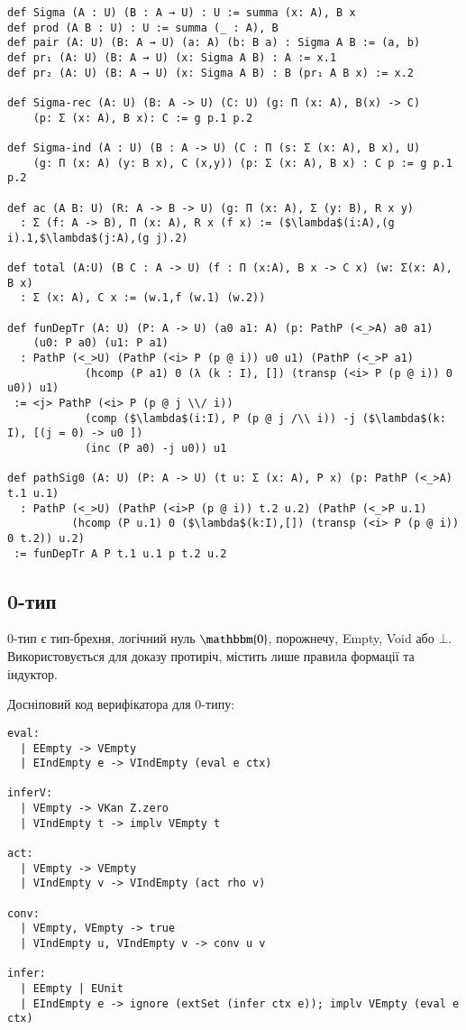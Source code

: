 \begin{lstlisting}
def Sigma (A : U) (B : A → U) : U := summa (x: A), B x
def prod (A B : U) : U := summa (_ : A), B
def pair (A: U) (B: A → U) (a: A) (b: B a) : Sigma A B := (a, b)
def pr₁ (A: U) (B: A → U) (x: Sigma A B) : A := x.1
def pr₂ (A: U) (B: A → U) (x: Sigma A B) : B (pr₁ A B x) := x.2
  
def Sigma-rec (A: U) (B: A -> U) (C: U) (g: Π (x: A), B(x) -> C)
    (p: Σ (x: A), B x): C := g p.1 p.2
  
def Sigma-ind (A : U) (B : A -> U) (C : Π (s: Σ (x: A), B x), U) 
    (g: Π (x: A) (y: B x), C (x,y)) (p: Σ (x: A), B x) : C p := g p.1 p.2
  
def ac (A B: U) (R: A -> B -> U) (g: Π (x: A), Σ (y: B), R x y)
  : Σ (f: A -> B), Π (x: A), R x (f x) := ($\lambda$(i:A),(g i).1,$\lambda$(j:A),(g j).2)
  
def total (A:U) (B C : A -> U) (f : Π (x:A), B x -> C x) (w: Σ(x: A), B x)
  : Σ (x: A), C x := (w.1,f (w.1) (w.2))
  
def funDepTr (A: U) (P: A -> U) (a0 a1: A) (p: PathP (<_>A) a0 a1)
    (u0: P a0) (u1: P a1)
  : PathP (<_>U) (PathP (<i> P (p @ i)) u0 u1) (PathP (<_>P a1)
            (hcomp (P a1) 0 (λ (k : I), []) (transp (<i> P (p @ i)) 0 u0)) u1)
 := <j> PathP (<i> P (p @ j \\/ i))
            (comp ($\lambda$(i:I), P (p @ j /\\ i)) -j ($\lambda$(k: I), [(j = 0) -> u0 ])
            (inc (P a0) -j u0)) u1
  
def pathSig0 (A: U) (P: A -> U) (t u: Σ (x: A), P x) (p: PathP (<_>A) t.1 u.1)
  : PathP (<_>U) (PathP (<i>P (p @ i)) t.2 u.2) (PathP (<_>P u.1)
          (hcomp (P u.1) 0 ($\lambda$(k:I),[]) (transp (<i> P (p @ i)) 0 t.2)) u.2)
 := funDepTr A P t.1 u.1 p t.2 u.2
\end{lstlisting}

\newpage
\subsection*{0-тип}

0-тип є тип-брехня, логічний нуль $\mathbbm{0}$, порожнечу, Empty, Void або $\bot$.
Використовується для доказу протиріч, містить лише правила формації та індуктор.

Досніповий код верифікатора для 0-типу:
\begin{lstlisting}
eval:
  | EEmpty -> VEmpty
  | EIndEmpty e -> VIndEmpty (eval e ctx)

inferV:
  | VEmpty -> VKan Z.zero
  | VIndEmpty t -> implv VEmpty t

act:
  | VEmpty -> VEmpty
  | VIndEmpty v -> VIndEmpty (act rho v)

conv:
  | VEmpty, VEmpty -> true
  | VIndEmpty u, VIndEmpty v -> conv u v

infer:
  | EEmpty | EUnit
  | EIndEmpty e -> ignore (extSet (infer ctx e)); implv VEmpty (eval e ctx)
\end{lstlisting}

